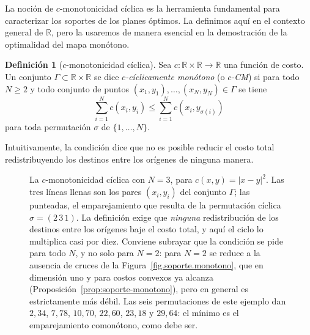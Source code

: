 \documentclass[12pt, a4paper]{amsbook}
\newcommand{\R}{{\mathbb R}}
\theoremstyle{remark}
\theoremstyle{definition}
\newtheorem{defi}[teo]{Definición}
\numberwithin{section}{chapter}
\numberwithin{subsection}{section}
\numberwithin{equation}{section}
\numberwithin{figure}{chapter}
\begin{document}
La noción de $c$-monotonicidad cíclica es la herramienta fundamental para caracterizar
los soportes de los planes óptimos. La definimos aquí en el contexto general de $\R$,
pero la usaremos de manera esencial en la demostración de la optimalidad del mapa
monótono.

\begin{defi}[$c$-monotonicidad cíclica]
Sea $c\colon\R\times\R\to\R$ una función de costo. Un conjunto $\Gamma\subset\R\times\R$
se dice \emph{$c$-cíclicamente monótono} (o \emph{$c$-CM}) si para todo $N\ge2$
y todo conjunto de puntos $(x_1,y_1),\ldots,(x_N,y_N)\in\Gamma$ se tiene
\[
\sum_{i=1}^N c(x_i,y_i)
\le
\sum_{i=1}^N c(x_i,y_{\sigma(i)})
\]
para toda permutación $\sigma$ de $\{1,\ldots,N\}$.
\end{defi}

Intuitivamente, la condición dice que no es posible reducir el costo total
redistribuyendo los destinos entre los orígenes de ninguna manera.

\begin{figure}[ht]
\centering
{}
\caption{La $c$-monotonicidad cíclica con $N=3$, para $c(x,y)=|x-y|^2$. Las
tres líneas llenas son los pares $(x_i,y_i)$ del conjunto $\Gamma$; las
punteadas, el emparejamiento que resulta de la permutación cíclica
$\sigma=(2\,3\,1)$. La definición exige que \emph{ninguna} redistribución de
los destinos entre los orígenes baje el costo total, y aquí el ciclo lo
multiplica casi por diez. Conviene subrayar que la condición se pide para
todo $N$, y no solo para $N=2$: para $N=2$ se reduce a la ausencia de cruces
de la Figura~\ref{fig.soporte.monotono}, que en dimensión uno y para costos
convexos ya alcanza (Proposición~\ref{prop:soporte-monotono}), pero en
general es estrictamente más débil. Las seis permutaciones de este ejemplo
dan $2{,}34$, $7{,}78$, $10{,}70$, $22{,}60$, $23{,}18$ y $29{,}64$: el
mínimo es el emparejamiento comonótono, como debe ser.}
\label{fig.cm.N3}
\end{figure}
\end{document}
